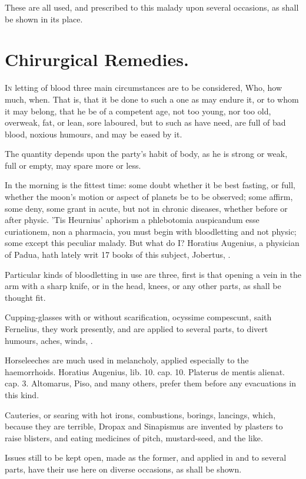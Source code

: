 {These are all used, and prescribed to this malady upon several
occasions, as shall be shown in its place.


\section{Chirurgical Remedies.}

\lettrine[lines=3]{I}{n} letting of blood three main circumstances are to be considered,
 Who, how much, when. That is, that it be done to such a one as
may endure it, or to whom it may belong, that he be of a competent age,
not too young, nor too old, overweak, fat, or lean, sore laboured, but
to such as have need, are full of bad blood, noxious humours, and may
be eased by it.

The quantity depends upon the party's habit of body, as he is strong or
weak, full or empty, may spare more or less.

In the morning is the fittest time: some doubt whether it be best
fasting, or full, whether the moon's motion or aspect of planets be to
be observed; some affirm, some deny, some grant in acute, but not in
chronic diseases, whether before or after physic. 'Tis Heurnius'
aphorism a phlebotomia auspicandum esse curiationem, non a pharmacia,
you must begin with bloodletting and not physic; some except this
peculiar malady. But what do I? Horatius Augenius, a physician of
Padua, hath lately writ 17 books of this subject, Jobertus, \etc{}.

Particular kinds of bloodletting in use are three, first is that
opening a vein in the arm with a sharp knife, or in the head, knees, or
any other parts, as shall be thought fit.

Cupping-glasses with or without scarification, ocyssime compescunt,
saith Fernelius, they work presently, and are applied to several parts,
to divert humours, aches, winds, \etc{}.

Horseleeches are much used in melancholy, applied especially to the
haemorrhoids. Horatius Augenius, lib. 10. cap. 10. Platerus de mentis
alienat. cap. 3. Altomarus, Piso, and many others, prefer them before
any evacuations in this kind.

Cauteries, or searing with hot irons, combustions, borings,
lancings, which, because they are terrible, Dropax and Sinapismus are
invented by plasters to raise blisters, and eating medicines of pitch,
mustard-seed, and the like.

Issues still to be kept open, made as the former, and applied in and to
several parts, have their use here on diverse occasions, as shall be
shown.
}

